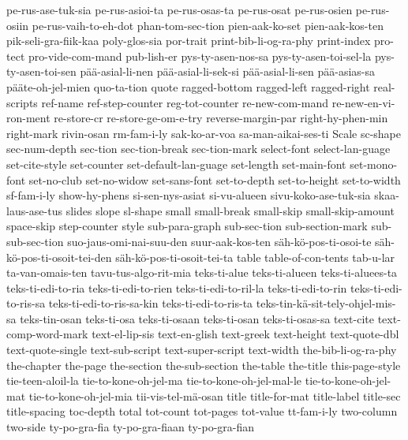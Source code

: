 {  pe-rus-ase-tuk-sia
  pe-rus-asioi-ta
  pe-rus-osas-ta
  pe-rus-osat
  pe-rus-osien
  pe-rus-osiin
  pe-rus-vaih-to-eh-dot
  phan-tom-sec-tion
  pien-aak-ko-set
  pien-aak-kos-ten
  pik-seli-gra-fiik-kaa
  poly-glos-sia
  por-trait
  print-bib-li-og-ra-phy
  print-index
  pro-tect
  pro-vide-com-mand
  pub-lish-er
  pys-ty-asen-nos-sa
  pys-ty-asen-toi-sel-la
  pys-ty-asen-toi-sen
  pää-asial-li-nen
  pää-asial-li-sek-si
  pää-asial-li-sen
  pää-asias-sa
  pääte-oh-jel-mien
  quo-ta-tion
  quote
  ragged-bottom
  ragged-left
  ragged-right
  real-scripts
  ref-name
  ref-step-counter
  reg-tot-counter
  re-new-com-mand
  re-new-en-vi-ron-ment
  re-store-cr
  re-store-ge-om-e-try
  reverse-margin-par
  right-hy-phen-min
  right-mark
  rivin-osan
  rm-fam-i-ly
  sak-ko-ar-voa
  sa-man-aikai-ses-ti
  Scale
  sc-shape
  sec-num-depth
  sec-tion
  sec-tion-break
  sec-tion-mark
  select-font
  select-lan-guage
  set-cite-style
  set-counter
  set-default-lan-guage
  set-length
  set-main-font
  set-mono-font
  set-no-club
  set-no-widow
  set-sans-font
  set-to-depth
  set-to-height
  set-to-width
  sf-fam-i-ly
  show-hy-phens
  si-sen-nys-asiat
  si-vu-alueen
  sivu-koko-ase-tuk-sia
  skaa-laus-ase-tus
  slides
  slope
  sl-shape
  small
  small-break
  small-skip
  small-skip-amount
  space-skip
  step-counter
  style
  sub-para-graph
  sub-sec-tion
  sub-section-mark
  sub-sub-sec-tion
  suo-jaus-omi-nai-suu-den
  suur-aak-kos-ten
  säh-kö-pos-ti-osoi-te
  säh-kö-pos-ti-osoit-tei-den
  säh-kö-pos-ti-osoit-tei-ta
  table
  table-of-con-tents
  tab-u-lar
  ta-van-omais-ten
  tavu-tus-algo-rit-mia
  teks-ti-alue
  teks-ti-alueen
  teks-ti-aluees-ta
  teks-ti-edi-to-ria
  teks-ti-edi-to-rien
  teks-ti-edi-to-ril-la
  teks-ti-edi-to-rin
  teks-ti-edi-to-ris-sa
  teks-ti-edi-to-ris-sa-kin
  teks-ti-edi-to-ris-ta
  teks-tin-kä-sit-tely-ohjel-mis-sa
  teks-tin-osan
  teks-ti-osa
  teks-ti-osaan
  teks-ti-osan
  teks-ti-osas-sa
  text-cite
  text-comp-word-mark
  text-el-lip-sis
  text-en-glish
  text-greek
  text-height
  text-quote-dbl
  text-quote-single
  text-sub-script
  text-super-script
  text-width
  the-bib-li-og-ra-phy
  the-chapter
  the-page
  the-section
  the-sub-section
  the-table
  the-title
  this-page-style
  tie-teen-aloil-la
  tie-to-kone-oh-jel-ma
  tie-to-kone-oh-jel-mal-le
  tie-to-kone-oh-jel-mat
  tie-to-kone-oh-jel-mia
  tii-vis-tel-mä-osan
  title
  title-for-mat
  title-label
  title-sec
  title-spacing
  toc-depth
  total
  tot-count
  tot-pages
  tot-value
  tt-fam-i-ly
  two-column
  two-side
  ty-po-gra-fia
  ty-po-gra-fiaan
  ty-po-gra-fian
}
